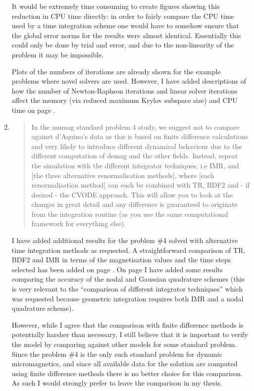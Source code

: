 \documentclass[12pt,a4paper,pdftex]{article}
\begin{document}
\begin{enumerate}
It would be extremely time consuming to create figures showing this reduction in CPU time directly: in order to fairly compare the CPU time used by a time integration scheme one would have to somehow ensure that the global error norms for the results were almost identical.
Essentially this could only be done by trial and error, and due to the non-linearity of the problem it may be impossible.

  Plots of the numbers of iterations are already shown for the example problems where novel solvers are used.
However, I have added descriptions of how the number of Newton-Raphson iterations and linear solver iterations affect the memory (via reduced maximum Krylov subspace size) and CPU time on page \pageref{mem-cpu-solver-correction}.

\item
  \begin{quotation}
    In the mumag standard problem 4 study, we suggest not to compare
    against d'Aquino's data as this is based on finite difference
    calculations and very likely to introduce different dynamical behaviour
    due to the different computation of demag and the other fields.
    Instead, repeat the simulation with the different integrator
    techniques, i.e IMR, and [the three alternative renormalisation
    methods], where [each renormalisation method] can each be combined with
    TR, BDF2 and - if desired - the CVODE approach. This will allow you to
    look at the changes in great detail and any difference is guaranteed to
    originate from the integration routine (as you use the same
    computational framework for everything else).
  \end{quotation}
  I have added additional results for the \mumag problem \#4 solved with alternative time integration methods as requested.
  A straightforward comparison of TR, BDF2 and IMR in terms of the magnetisation values and the time steps selected has been added on page \pageref{more-mumag4-correction-1}.
  On page \pageref{more-mumag4-correction-2} I have added some results comparing the accuracy of the nodal and Gaussian quadrature schemes (this is very relevant to the ``comparison of different integrator techniques'' which was requested because geometric integration requires both IMR and a nodal quadrature scheme).

  However, while I agree that the comparison with finite difference methods is potentially harsher than necessary, I still believe that it is important to verify the model by comparing against other models for some standard problem.
  Since the \mumag problem \#4 is the only such standard problem for dynamic micromagnetics, and since all available data for the solution are computed using finite difference methods there is no better choice for this comparison.
  As such I would strongly prefer to leave the comparison in my thesis.


\end{enumerate}
\end{document}
